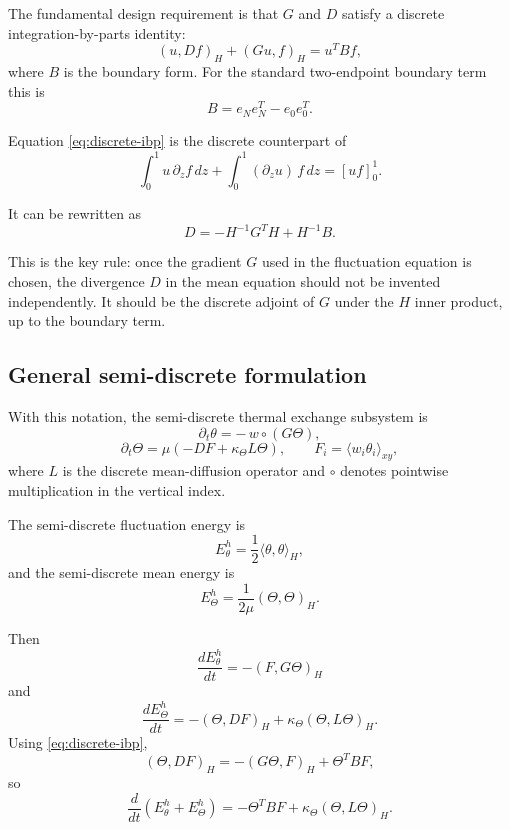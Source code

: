 \documentclass[11pt]{article}
\begin{document}
The fundamental design requirement is that $G$ and $D$ satisfy a discrete integration-by-parts identity:
\begin{equation}
(u, Df)_H + (Gu, f)_H = u^T B f,
\label{eq:discrete-ibp}
\end{equation}
where $B$ is the boundary form. For the standard two-endpoint boundary term this is
\[
B = e_N e_N^T - e_0 e_0^T.
\]

Equation \eqref{eq:discrete-ibp} is the discrete counterpart of
\[
\int_0^1 u\,\partial_z f\,dz + \int_0^1 (\partial_z u)\,f\,dz = [u f]_0^1.
\]

It can be rewritten as
\begin{equation}
D = -H^{-1} G^T H + H^{-1} B.
\label{eq:D-adjoint}
\end{equation}

This is the key rule: once the gradient $G$ used in the fluctuation equation is chosen, the divergence $D$ in the mean equation should not be invented independently. It should be the discrete adjoint of $G$ under the $H$ inner product, up to the boundary term.

\subsection{General semi-discrete formulation}

With this notation, the semi-discrete thermal exchange subsystem is
\begin{equation}
\partial_t \theta = -\,w \circ (G\Theta),
\label{eq:theta-semi}
\end{equation}
\begin{equation}
\partial_t \Theta = \mu\left(-D F + \kappa_\Theta L\Theta\right),
\qquad
F_i = \langle w_i \theta_i\rangle_{xy},
\label{eq:Theta-semi}
\end{equation}
where $L$ is the discrete mean-diffusion operator and $\circ$ denotes pointwise multiplication in the vertical index.

The semi-discrete fluctuation energy is
\[
E_\theta^h = \frac12 \langle \theta,\theta\rangle_H,
\]
and the semi-discrete mean energy is
\[
E_\Theta^h = \frac{1}{2\mu}(\Theta,\Theta)_H.
\]

Then
\[
\frac{dE_\theta^h}{dt}
=
-
(F,G\Theta)_H
\]
and
\[
\frac{dE_\Theta^h}{dt}
=
-(\Theta,DF)_H
+
\kappa_\Theta (\Theta,L\Theta)_H.
\]
Using \eqref{eq:discrete-ibp},
\[
(\Theta,DF)_H = -(G\Theta,F)_H + \Theta^T B F,
\]
so
\begin{equation}
\frac{d}{dt}(E_\theta^h + E_\Theta^h)
=
-\Theta^T B F
+
\kappa_\Theta(\Theta,L\Theta)_H.
\label{eq:semi-disc-energy}
\end{equation}
\end{document}
